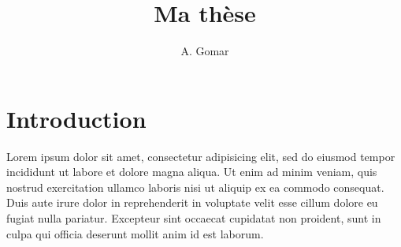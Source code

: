 \documentclass[french, notconfidential, hyperlink, short]{AAMreport}
\title{\LARGE Ma thèse}
\author{A. Gomar}
\begin{document}
\maketitle

\cleardoublepage

\vspace*{\fill}

\tableofcontents

\vspace*{\fill}
\clearpage

\section{Introduction}

Lorem ipsum dolor sit amet, consectetur adipisicing elit, sed do eiusmod
tempor incididunt ut labore et dolore magna aliqua. Ut enim ad minim veniam,
quis nostrud exercitation ullamco laboris nisi ut aliquip ex ea commodo
consequat. Duis aute irure dolor in reprehenderit in voluptate velit esse
cillum dolore eu fugiat nulla pariatur. Excepteur sint occaecat cupidatat non
proident, sunt in culpa qui officia deserunt mollit anim id est laborum.



\end{document}
